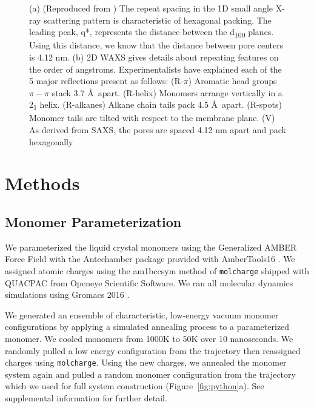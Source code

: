 \documentclass{article}
\begin{document}
\begin{figure}
\begin{subfigure}[t]{0.47\linewidth}
                \caption{}\label{fig:WAXS}
        \end{subfigure}
	\caption{(a) (Reproduced from \cite{feng_thin_2016}) The repeat spacing
		in the 1D small angle X-ray scattering pattern is characteristic of hexagonal
		packing. The leading peak, q*, represents the distance between the
		d\textsubscript{100} planes. Using this distance, we know that the distance
		between pore centers is 4.12 nm. (b) 2D WAXS gives
		details about repeating features on the order of angstroms. Experimentalists
		have explained each of the 5 major reflections present as follows: (R-$\pi$) Aromatic
		head groups $\pi-\pi$ stack 3.7 \AA~apart. (R-helix) Monomers arrange vertically in
		a 2\textsubscript{1} helix. (R-alkanes) Alkane chain tails pack 4.5 \AA~apart. (R-spots)
		Monomer tails are tilted with respect to the membrane plane. (V) As derived from
		SAXS, the pores are spaced 4.12 nm apart and pack hexagonally}
	\label{fig:SWAXS}
 \end{figure}

  \section{Methods}
 
  \subsection{Monomer Parameterization}

  We parameterized the liquid crystal monomers using the Generalized AMBER
  Force Field \cite{wang_development_2004} with the Antechamber package
  \cite{wang_automatic_2006} provided with AmberTools16
  \cite{case_ambertools16_2016}. We assigned atomic charges using the am1bccsym
  method of \texttt{molcharge} shipped with QUACPAC from Openeye Scientific
  Software. We ran all molecular dynamics simulations using Gromacs 2016
  \cite{bekker_gromacs:_1993,berendsen_gromacs:_1995,van_der_spoel_gromacs:_2005,hess_gromacs_2008}.

  We generated an ensemble of characteristic, low-energy vacuum monomer
  configurations by applying a simulated annealing process to a
  parameterized monomer. We cooled monomers from 1000K to 50K over 10
  nanoseconds. We randomly pulled a low energy configuration from the
  trajectory then reassigned charges using \texttt{molcharge}. Using the new
  charges, we annealed the monomer system again and pulled a random monomer
  configuration from the trajectory which we used for full system
  construction (Figure~\ref{fig:python}a). See supplemental information for
  further detail.
\end{document}
